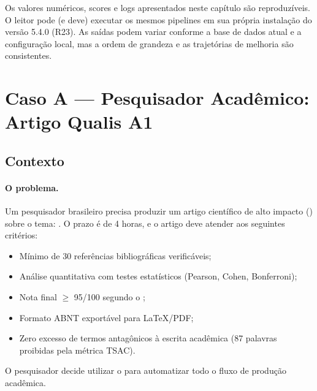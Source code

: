 \begin{observacao}
Os valores numéricos, scores e logs apresentados neste capítulo são
reproduzíveis. O leitor pode (e deve) executar os mesmos pipelines em
sua própria instalação do \opencodeeco{} versão 5.4.0 (R23). As saídas
podem variar conforme a base de dados atual e a configuração local, mas
a ordem de grandeza e as trajetórias de melhoria são consistentes.
\end{observacao}

\section{Caso A — Pesquisador Acadêmico: Artigo Qualis A1}
\label{sec:caso-pesquisador}
\nivelavancado

\subsection{Contexto}

\paragraph{O problema.} Um pesquisador brasileiro precisa produzir um
artigo científico de alto impacto (\qualisA{}) sobre o tema:
. O prazo é de 4 horas, e o artigo deve
atender aos seguintes critérios:

\begin{itemize}
    \item Mínimo de 30 referências bibliográficas verificáveis;
    \item Análise quantitativa com testes estatísticos (Pearson,
          Cohen, Bonferroni);
    \item Nota final \qualisA{} $\ge$ 95/100 segundo o
          ;
    \item Formato ABNT exportável para LaTeX/PDF;
    \item Zero excesso de termos antagônicos à escrita acadêmica
          (87 palavras proibidas pela métrica TSAC).
\end{itemize}

\noindent O pesquisador decide utilizar o \opencodeeco{} para
automatizar todo o fluxo de produção acadêmica.

